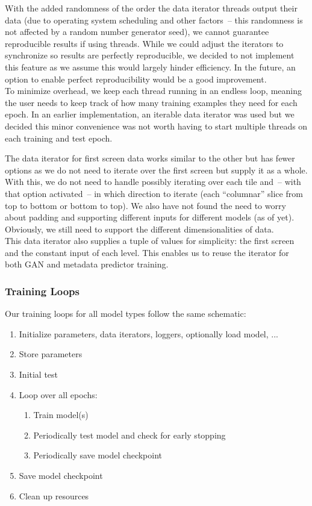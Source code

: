 With the added randomness of the order the data iterator threads
output their data (due to operating system scheduling and other
factors~-- this randomness is not affected by a random number generator
seed), we cannot guarantee reproducible results if using threads.
While we could adjust the iterators to synchronize so results are
perfectly reproducible, we decided to not implement this feature as we
assume this would largely hinder efficiency. In the future, an option
to enable perfect reproducibility would be a good improvement. \\
To minimize overhead, we keep each thread running in an endless loop,
meaning the user needs to keep track of how many training examples
they need for each epoch. In an earlier implementation, an iterable
data iterator was used but we decided this minor convenience was not
worth having to start multiple threads on each training and test
epoch.

The data iterator for first screen data works similar to the other but
has fewer options as we do not need to iterate over the first screen
but supply it as a whole. With this, we do not need to handle possibly
iterating over each tile and~-- with that option activated~-- in which
direction to iterate (each ``columnar'' slice from top to bottom or
bottom to top). We also have not found the need to worry about padding
and supporting different inputs for different models (as of yet).
Obviously, we still need to support the different dimensionalities of
data. \\
This data iterator also supplies a tuple of values for simplicity: the
first screen and the constant input of each level. This enables us to
reuse the iterator for both GAN and metadata predictor training.

\subsubsection{Training Loops}
\label{sec:training-loops}

Our training loops for all model types follow the same schematic:
\begin{enumerate}
\item Initialize parameters, data iterators, loggers, optionally load
  model, ...
\item Store parameters
\item Initial test
\item Loop over all epochs:
  \begin{enumerate}
    \item Train model(s)
    \item Periodically test model and check for early stopping
    \item Periodically save model checkpoint
  \end{enumerate}
\item Save model checkpoint
\item Clean up resources
\end{enumerate}

